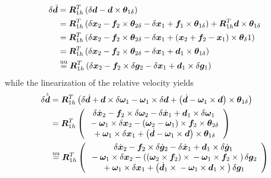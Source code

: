 \documentclass[10pt,dvips,fleqn,subeqn]{report}
\newcommand{\T}[1]{\bm{#1}}
\newcommand{\equu}{\overset{\text{uu}}{=}}
\begin{document}
\begin{align}
	\delta{\tilde{\T{d}}}
	&= \T{R}_{1h}^T\plbr{
		\delta\T{d} - \T{d} \times \T{\theta}_{1\delta}
	} \nonumber \\
	&= \T{R}_{1h}^T\plbr{
		\delta{\T{x}}_2 - \T{f}_2\times\T{\theta}_{2\delta}
		- \delta{\T{x}}_1 + \T{f}_1\times\T{\theta}_{1\delta}
	} + \T{R}_{1h}^T \T{d}\times\T{\theta}_{1\delta} \nonumber \\
	&= \T{R}_{1h}^T\plbr{
		\delta{\T{x}}_2
		- \T{f}_2\times\T{\theta}_{2\delta}
		- \delta{\T{x}}_1
		+ \plbr{
			\T{x}_2
			+ \T{f}_2
			- \T{x}_1
		}\times\T{\theta}_{\delta}1
	} \nonumber \\
	&= \T{R}_{1h}^T\plbr{
		\delta{\T{x}}_2
		- \T{f}_2\times\T{\theta}_{2\delta}
		- \delta{\T{x}}_1
		+ \T{d}_1\times\T{\theta}_{1\delta}
	} \nonumber \\
	&\equu \T{R}_{1h}^T\plbr{
		\delta{\T{x}}_2
		- \T{f}_2\times\delta\T{g}_2
		- \delta{\T{x}}_1
		+ \T{d}_1\times\delta\T{g}_1
	}
\end{align}
while the linearization of the relative velocity yields
\begin{align}
	\delta\dot{\tilde{\T{d}}}
	&= \T{R}_{1h}^T\plbr{
		\delta\dot{\T{d}}
		+ \T{d} \times \delta\T{\omega}_1
		- \T{\omega}_1 \times \delta\T{d}
		+ \plbr{
			\dot{\T{d}}
			- \T{\omega}_1 \times \T{d}
		}\times\T{\theta}_{1\delta}
	} \nonumber \\
	&= \T{R}_{1h}^T\plbr{\cvvect{
		\delta\dot{\T{x}}_2
		- \T{f}_2\times\delta\T{\omega}_2
		- \delta\dot{\T{x}}_1
		+ \T{d}_1\times\delta\T{\omega}_1 \\
	\mbox{} - \T{\omega}_1 \times \delta\T{x}_2
		- \plbr{
			\T{\omega}_2 
			- \T{\omega}_1
		} \times \T{f}_2 \times\T{\theta}_{2\delta} \\
	\mbox{} + \T{\omega}_1 \times \delta\T{x}_1
		+ \plbr{
			\dot{\T{d}} - \T{\omega}_1 \times \T{d}
		} \times \T{\theta}_{1\delta}
	}} \nonumber \\
	&\equu \T{R}_{1h}^T\plbr{\cvvect{
		\delta\dot{\T{x}}_2
		- \T{f}_2\times\delta\dot{\T{g}}_2
		- \delta\dot{\T{x}}_1
		+ \T{d}_1\times\delta\dot{\T{g}}_1 \\
	\mbox{} - \T{\omega}_1 \times \delta\T{x}_2
		- \plbr{
			\plbr{\T{\omega}_2 \times \T{f}_2}\times{}
			- \T{\omega}_1 \times \T{f}_2 \times{}
		} \delta\T{g}_2 \\
	\mbox{} + \T{\omega}_1 \times \delta\T{x}_1
		+ \plbr{
			\dot{\T{d}}_1 \times{}
			- \T{\omega}_1 \times \T{d}_1\times{}
		} \delta\T{g}_1
	}}
\end{align}
\end{document}
